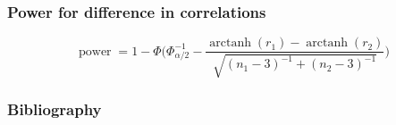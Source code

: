 \documentclass{beamer}
\DeclareMathOperator\arctanh{arctanh}
\DeclareMathOperator\power{power}
\begin{document}
  \begin{frame}
    \frametitle{Power for difference in correlations}  

    \[ \power = 1- \Phi \bigg(\Phi_{\alpha/2}^{-1} - \frac{\arctanh(r_1) - \arctanh(r_2)}{\sqrt{(n_1-3)^{-1} + (n_2-3)^{-1}}} \bigg) \]
  \end{frame}


  \begin{frame}
    \frametitle{Bibliography}
    \printbibliography

  \end{frame}
  
\end{document}
